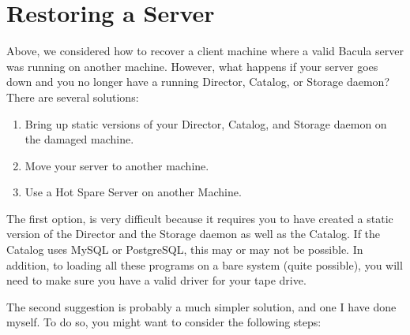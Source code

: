 \section{Restoring a Server}

Above, we considered how to recover a client machine where a valid Bacula
server was running on another machine. However, what happens if your server
goes down and you no longer have a running Director, Catalog, or Storage
daemon? There are several solutions: 

\begin{enumerate}
\item Bring up static versions of your Director, Catalog, and Storage  daemon 
   on the damaged machine.

\item Move your server to another machine. 

\item Use a Hot Spare Server on another Machine.
\end{enumerate}

The first option, is very difficult because it requires you to have created a
static version of the Director and the Storage daemon as well as the Catalog.
If the Catalog uses MySQL or PostgreSQL, this may or may not be possible. In
addition, to loading all these programs on a bare system (quite possible), you
will need to make sure you have a valid driver for your tape drive. 

The second suggestion is probably a much simpler solution, and one I have done
myself. To do so, you might want to consider the following steps: 

